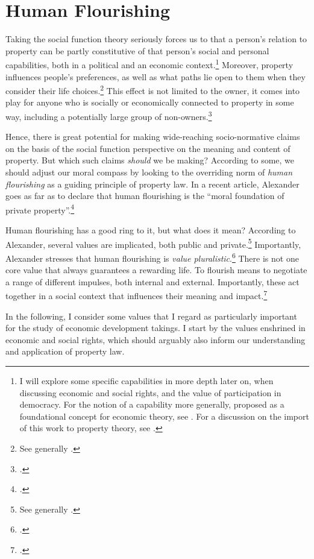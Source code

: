 \section{Human Flourishing}\label{sec:2:5}

Taking the social function theory seriously forces us to  that a person's relation to property can be partly constitutive of that person's social and personal capabilities, both in a political and an economic context.\footnote{I will explore some specific capabilities in more depth later on, when discussing economic and social rights, and the value of participation in democracy. For the notion of a capability more generally, proposed as a foundational concept for economic theory, see \cite{sen85}. For a discussion on the import of this work to property theory, see \cite[105]{alexander09}.} Moreover, property influences people's preferences, as well as what paths lie open to them when they consider their life choices.\footnote{See generally \cite{alexander09}.} This effect is not limited to the owner, it comes into play for anyone who is socially or economically connected to property in some way, including a potentially large group of non-owners.\footcite[128-129]{alexander09d}

Hence, there is great potential for making wide-reaching socio-normative claims on the basis of the social function perspective on the meaning and content of property. But which such claims {\it should} we be making? According to some, we should adjust our moral compass by looking to the overriding norm of {\it human flourishing} as a guiding principle of property law. In a recent article, Alexander goes as far as to declare that human flourishing is the ``moral foundation of private property''.\footcite[1261]{alexander14} 

Human flourishing has a good ring to it, but what does it mean? According to Alexander, several values are implicated, both public and private.\footnote{See generally \cite{alexander14,alexander11}.} Importantly, Alexander stresses that human flourishing is {\it value pluralistic}.\footnote{\cite[750-751]{alexander09}.} There is not one core value that always guarantees a rewarding life. To flourish means to negotiate a range of different impulses, both internal and external. Importantly, these act together in a social context that influences their meaning and impact.\footcite[1035-1052]{alexander11}

In the following, I consider some values that I regard as particularly important for the study of economic development takings. I start by the values enshrined in economic and social rights, which should arguably also inform our understanding and application of property law.

